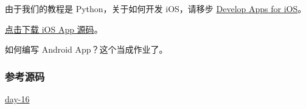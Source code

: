 由于我们的教程是 Python，关于如何开发 iOS，请移步
\href{https://developer.apple.com/technologies/ios/}{Develop Apps for
iOS}。

\href{https://github.com/michaelliao/awesome-python3-webapp/tree/day-16/ios}{点击下载
iOS App 源码}。

如何编写 Android App？这个当成作业了。

\hypertarget{ux53c2ux8003ux6e90ux7801}{%
\subsubsection{参考源码}\label{ux53c2ux8003ux6e90ux7801}}

\href{https://github.com/michaelliao/awesome-python3-webapp/tree/day-16}{day-16}

